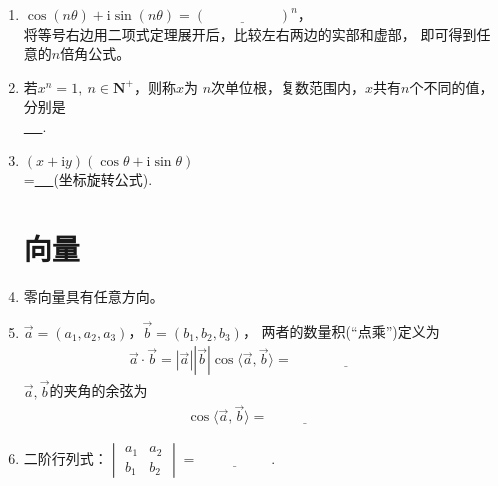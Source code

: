 \documentclass{article}
\newif\ifte
\renewcommand{\vec}{\overrightarrow}
\newcommand{\e}{\mathrm{e}}
\renewcommand{\i}{\mathrm{i}}
\begin{document}
\begin{multicols}{2}
\begin{enumerate}[leftmargin=20pt]
\item $ \cos (n\theta)+\i\sin (n\theta)=(\underline{\ \ifte 
 \cos\theta+\i\sin\theta \else \hspace{2cm} \fi\ })^n $，\\
将等号右边用二项式定理展开后，比较左右两边的实部和虚部，
即可得到任意的$ n $倍角公式。

\item 若$ x^n=1,\ n\in \textbf{N}^+ $，则称$ x $为
$ n $次单位根，复数范围内，$ x $共有$ n $个不同的值，分别是 \\
\underline{\ \ifte $ \e^{2k\pi \i/n},\ k=0,1,2,\cdots,n-1 $
    \else \hspace{2cm} \fi\ }.

\item $ (x+\i y)(\cos\theta +\i\sin\theta) $\\
=\underline{\ \ifte $ (x\cos\theta-y\sin\theta)+
\i(x\sin\theta+y\cos\theta) $\else \hspace{5cm} \fi\ }(坐标旋转公式).

\section{向量}

\item 零向量具有任意方向。

\item $ \vec{a}=(a_1,a_2,a_3) $，$ \vec{b}=(b_1,b_2,b_3) $，
两者的数量积(“点乘”)定义为
\begin{gather*}
    \vec{a}\cdot\vec{b}=|\vec{a}||\vec{b}|
    \cos \langle\vec{a},\vec{b}\rangle=\underline{\ \ifte 
     a_1b_1+a_2b_2+a_3b_3\else \hspace{3cm} \fi\ }
\end{gather*}
$ \vec{a},\vec{b} $的夹角的余弦为
\begin{gather*}
    \cos \langle\vec{a},\vec{b}\rangle=\underline{\ 
    \ifte \dfrac{\vec{a}\cdot\vec{b}}{|\vec{a}||\vec{b}|}
    \else \hspace{2cm} \fi\ }
\end{gather*}

\renewcommand\arraystretch{1} 
\item 二阶行列式：$ \begin{vmatrix}
    a_1 & a_2\\
    b_1 & b_2
\end{vmatrix}=\underline{\ \ifte a_1b_2-a_2b_1
\else \hspace{2cm} \fi\ } $.


\end{enumerate}
\end{multicols}
\end{document}
